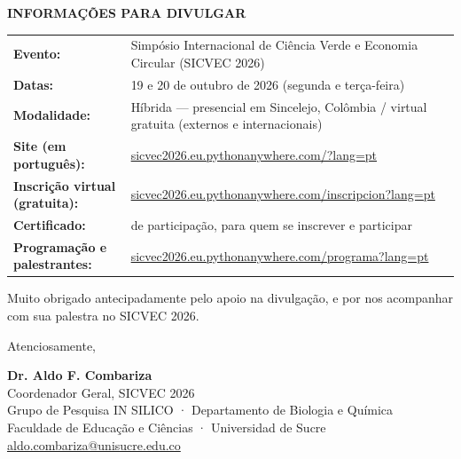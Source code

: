 \documentclass[11pt,a4paper]{article}
\begin{document}
\vspace{0.1cm}

\noindent
\textbf{INFORMAÇÕES PARA DIVULGAR}

\begin{tabularx}{\linewidth}{@{}l X@{}}
\textbf{Evento:} & Simpósio Internacional de Ciência Verde e Economia Circular (SICVEC 2026) \\
\textbf{Datas:} & 19 e 20 de outubro de 2026 (segunda e terça-feira) \\
\textbf{Modalidade:} & Híbrida — presencial em Sincelejo, Colômbia / virtual gratuita (externos e internacionais) \\
\textbf{Site (em português):} & \href{https://sicvec2026.eu.pythonanywhere.com/?lang=pt}{sicvec2026.eu.pythonanywhere.com/?lang=pt} \\
\textbf{Inscrição virtual (gratuita):} & \href{https://sicvec2026.eu.pythonanywhere.com/inscripcion?lang=pt}{sicvec2026.eu.pythonanywhere.com/inscripcion?lang=pt} \\
\textbf{Certificado:} & de participação, para quem se inscrever e participar \\
\textbf{Programação e palestrantes:} & \href{https://sicvec2026.eu.pythonanywhere.com/programa?lang=pt}{sicvec2026.eu.pythonanywhere.com/programa?lang=pt} \\
\end{tabularx}

\vspace{0.1cm}

Muito obrigado antecipadamente pelo apoio na divulgação, e por nos acompanhar com sua palestra no SICVEC 2026.

\vspace{0.15cm}

Atenciosamente,

\vspace{0.15cm}

\textbf{Dr. Aldo F. Combariza}\\
Coordenador Geral, SICVEC 2026\\
Grupo de Pesquisa IN SILICO · Departamento de Biologia e Química\\
Faculdade de Educação e Ciências · Universidad de Sucre\\
\href{mailto:aldo.combariza@unisucre.edu.co}{aldo.combariza@unisucre.edu.co}
\end{document}
